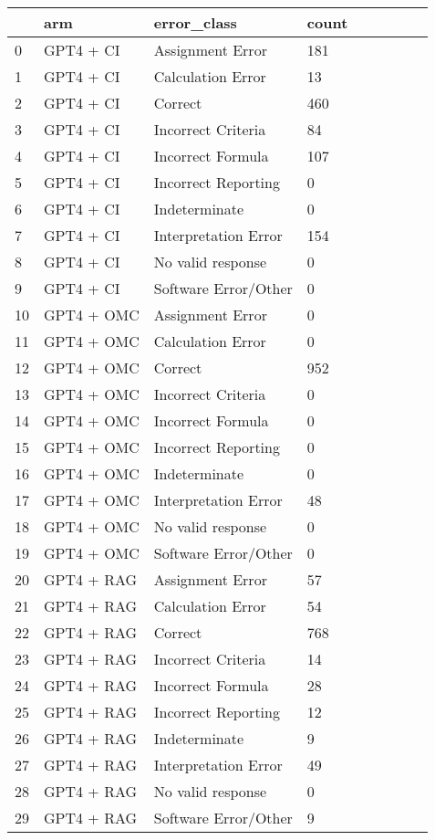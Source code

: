 \begin{tabular}{|l|l|l|l|l|l|l|l|l|}
\toprule
 & arm & error\_class & count \\
\midrule
0 & GPT4 + CI & Assignment Error & 181 \\
1 & GPT4 + CI & Calculation Error & 13 \\
2 & GPT4 + CI & Correct & 460 \\
3 & GPT4 + CI & Incorrect Criteria & 84 \\
4 & GPT4 + CI & Incorrect Formula & 107 \\
5 & GPT4 + CI & Incorrect Reporting & 0 \\
6 & GPT4 + CI & Indeterminate & 0 \\
7 & GPT4 + CI & Interpretation Error & 154 \\
8 & GPT4 + CI & No valid response & 0 \\
9 & GPT4 + CI & Software Error/Other & 0 \\
10 & GPT4 + OMC & Assignment Error & 0 \\
11 & GPT4 + OMC & Calculation Error & 0 \\
12 & GPT4 + OMC & Correct & 952 \\
13 & GPT4 + OMC & Incorrect Criteria & 0 \\
14 & GPT4 + OMC & Incorrect Formula & 0 \\
15 & GPT4 + OMC & Incorrect Reporting & 0 \\
16 & GPT4 + OMC & Indeterminate & 0 \\
17 & GPT4 + OMC & Interpretation Error & 48 \\
18 & GPT4 + OMC & No valid response & 0 \\
19 & GPT4 + OMC & Software Error/Other & 0 \\
20 & GPT4 + RAG & Assignment Error & 57 \\
21 & GPT4 + RAG & Calculation Error & 54 \\
22 & GPT4 + RAG & Correct & 768 \\
23 & GPT4 + RAG & Incorrect Criteria & 14 \\
24 & GPT4 + RAG & Incorrect Formula & 28 \\
25 & GPT4 + RAG & Incorrect Reporting & 12 \\
26 & GPT4 + RAG & Indeterminate & 9 \\
27 & GPT4 + RAG & Interpretation Error & 49 \\
28 & GPT4 + RAG & No valid response & 0 \\
29 & GPT4 + RAG & Software Error/Other & 9 \\

\end{tabular}
